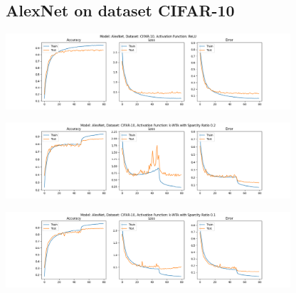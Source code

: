 \documentclass[a4paper]{article}
\begin{document}
		\subsection{AlexNet on dataset CIFAR-10}
			\begin{center}
				\centering
				\includegraphics[width=400px,keepaspectratio]{Results/AlexNet_CIFAR-10_ReLU.png}
			\end{center}
			\begin{center}
				\centering
				\includegraphics[width=400px,keepaspectratio]{Results/AlexNet_CIFAR-10_k-WTA_0.2.png}
			\end{center}
			\begin{center}
				\centering
				\includegraphics[width=400px,keepaspectratio]{Results/AlexNet_CIFAR-10_k-WTA_0.1.png}
			\end{center}
		
\end{document}
